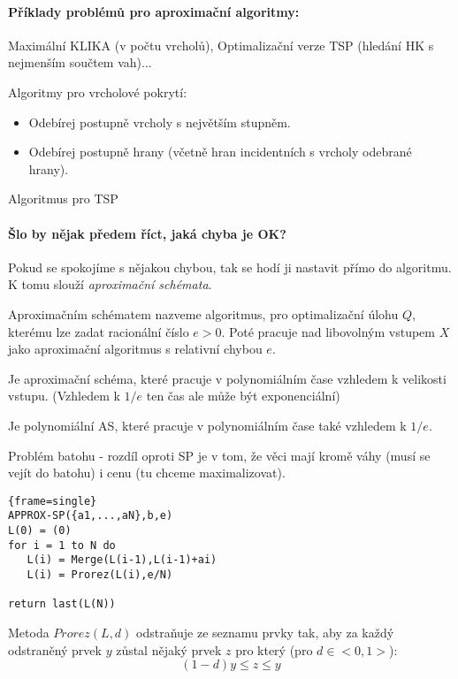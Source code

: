 \documentclass[a4paper]{article}      %
\newenvironment{definition}[1][Definice]{\begin{trivlist}
\item[\hskip \labelsep {\bfseries #1}]}{\end{trivlist}}
\newenvironment{example}[1][Příklad]{\begin{trivlist}
\item[\hskip \labelsep {\bfseries #1}]}{\end{trivlist}}
\begin{document}
\paragraph{Příklady problémů pro aproximační algoritmy:} Maximální KLIKA (v počtu vrcholů), Optimalizační verze TSP (hledání HK s nejmenším součtem vah)...

\begin{example}[Aproximační algoritmy]
Algoritmy pro vrcholové pokrytí:
\begin{itemize}
\item Odebírej postupně vrcholy s největším stupněm.
\item Odebírej postupně hrany (včetně hran incidentních s vrcholy odebrané hrany).
\end{itemize}
Algoritmus pro TSP
\end{example}

\paragraph{Šlo by nějak předem říct, jaká chyba je OK?} Pokud se spokojíme s nějakou chybou, tak se hodí ji nastavit přímo do algoritmu.
K tomu slouží \emph{aproximační schémata}.  

\begin{definition}[Aproximační schéma]
Aproximačním schématem nazveme algoritmus, pro optimalizační úlohu $Q$, kterému lze zadat racionální číslo $e>0$.
Poté pracuje nad libovolným vstupem $X$ jako aproximační algoritmus s relativní chybou $e$.
\end{definition}

\begin{definition}[Polynomiální AS]
Je aproximační schéma, které pracuje v polynomiálním čase vzhledem k velikosti vstupu. (Vzhledem k $1/e$ ten čas ale může být exponenciální)
\end{definition}

\begin{definition}[Úplně Polynomiální AS]
Je polynomiální AS, které pracuje v polynomiálním čase také vzhledem k $1/e$.
\end{definition}

\begin{example}[Příklad AS]
Problém batohu - rozdíl oproti SP je v tom, že věci mají kromě váhy (musí se vejít do batohu) i cenu (tu chceme maximalizovat).
\lstset{
	basicstyle=\small,
	stringstyle=\ttfamily,
	columns=fixed,
        numbers=left,
	basewidth=0.6em,
	breaklines=true,
	breakautoindent=true}
\begin{lstlisting}{frame=single}
APPROX-SP({a1,...,aN},b,e) 
L(0) = (0)
for i = 1 to N do
   L(i) = Merge(L(i-1),L(i-1)+ai)
   L(i) = Prorez(L(i),e/N)

return last(L(N))
\end{lstlisting}
Metoda $Prorez(L,d)$ odstraňuje ze seznamu prvky tak, aby za každý odstraněný prvek $y$ zůstal nějaký prvek $z$ pro který (pro $d \in <0,1>$):
\[
(1-d)y \leq z \leq y
\]
\end{example}
\end{document}

